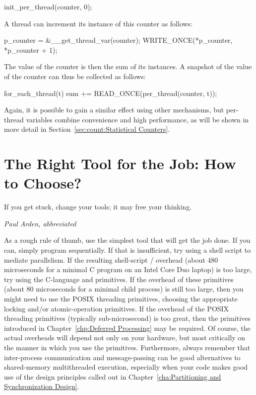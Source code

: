 \begin{VerbatimU}
init_per_thread(counter, 0);
\end{VerbatimU}

A thread can increment its instance of this counter as follows:

\begin{VerbatimU}
p_counter = &__get_thread_var(counter);
WRITE_ONCE(*p_counter, *p_counter + 1);
\end{VerbatimU}

The value of the counter is then the sum of its instances.
A snapshot of the value of the counter can thus be collected
as follows:

\begin{VerbatimU}
for_each_thread(t)
  sum += READ_ONCE(per_thread(counter, t));
\end{VerbatimU}

Again, it is possible to gain a similar effect using other mechanisms,
but per-thread variables combine convenience and high performance,
as will be shown in more detail in
Section~\ref{sec:count:Statistical Counters}.

\section{The Right Tool for the Job: How to Choose?}
\label{sec:toolsoftrade:The Right Tool for the Job: How to Choose?}
%
\epigraph{If you get stuck, change your tools; it may free your thinking.}
	 {\emph{Paul Arden, abbreviated}}

As a rough rule of thumb, use the simplest tool that will get the job done.
If you can, simply program sequentially.
If that is insufficient, try using a shell script to mediate parallelism.
If the resulting shell-script / overhead
(about 480 microseconds for a minimal C program on an Intel Core Duo
laptop) is too
large, try using the C-language  and  primitives.
If the overhead of these primitives (about 80 microseconds for a minimal
child process) is still too large, then you
might need to use the POSIX threading primitives, choosing the appropriate
locking and/or atomic-operation primitives.
If the overhead of the POSIX threading primitives (typically sub-microsecond)
is too great, then the primitives introduced in
Chapter~\ref{chp:Deferred Processing} may be required.
Of course, the actual overheads will depend not only on your hardware,
but most critically on the manner in which you use the primitives.
Furthermore, always remember that inter-process communication and
message-passing can be good alternatives to shared-memory multithreaded
execution, especially when your code makes good use of the design
principles called out in
Chapter~\ref{cha:Partitioning and Synchronization Design}.

